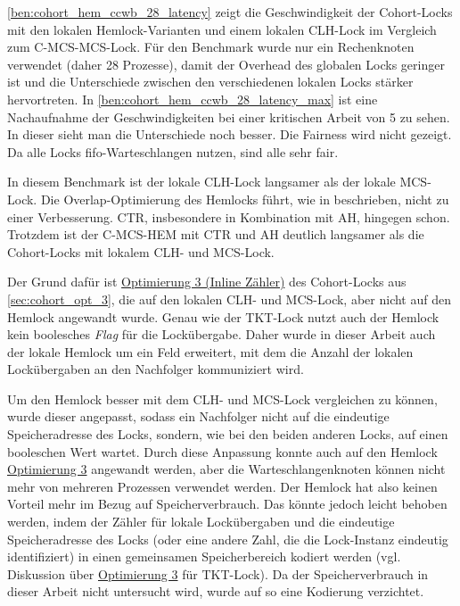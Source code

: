 \autoref{ben:cohort_hem_ccwb_28_latency} zeigt die Geschwindigkeit der Cohort-Locks mit den lokalen Hemlock-Varianten
und einem lokalen CLH-Lock
im Vergleich zum C-MCS-MCS-Lock.
Für den Benchmark wurde nur ein Rechenknoten verwendet (daher 28 Prozesse),
damit der Overhead des globalen Locks geringer ist
und die Unterschiede zwischen den verschiedenen lokalen Locks stärker hervortreten.
In \autoref{ben:cohort_hem_ccwb_28_latency_max} ist eine Nachaufnahme der Geschwindigkeiten
bei einer kritischen Arbeit von 5 zu sehen.
In dieser sieht man die Unterschiede noch besser.
Die Fairness wird nicht gezeigt.
Da alle Locks \gls{fifo}-Warteschlangen nutzen,
sind alle sehr fair.

In diesem Benchmark ist der lokale CLH-Lock langsamer
als der lokale MCS-Lock.
Die Overlap-Optimierung des Hemlocks führt,
wie in \cite{Hemlock} beschrieben,
nicht zu einer Verbesserung.
CTR,
insbesondere in Kombination mit AH,
hingegen schon.
Trotzdem ist der C-MCS-HEM mit CTR und AH deutlich langsamer
als die Cohort-Locks mit lokalem CLH- und MCS-Lock.

Der Grund dafür ist \hyperref[sec:cohort_opt_3]{Optimierung 3 (Inline Zähler)} des Cohort-Locks aus \autoref{sec:cohort_opt_3},
die auf den lokalen CLH- und MCS-Lock,
aber nicht auf den Hemlock angewandt wurde.
Genau wie der TKT-Lock nutzt auch der Hemlock kein boolesches \textit{Flag} für die Lockübergabe.
Daher wurde in dieser Arbeit auch der lokale Hemlock um ein Feld erweitert,
mit dem die Anzahl der lokalen Lockübergaben an den Nachfolger kommuniziert wird.

Um den Hemlock besser mit dem CLH- und MCS-Lock vergleichen zu können,
wurde dieser angepasst,
sodass ein Nachfolger nicht auf die eindeutige Speicheradresse des Locks,
sondern,
wie bei den beiden anderen Locks,
auf einen booleschen Wert wartet.
Durch diese Anpassung konnte auch auf den Hemlock \hyperref[sec:cohort_opt_3]{Optimierung 3} angewandt werden,
aber die Warteschlangenknoten können nicht mehr von mehreren Prozessen verwendet werden.
Der Hemlock hat also keinen Vorteil mehr im Bezug auf Speicherverbrauch.
Das könnte jedoch leicht behoben werden,
indem der Zähler für lokale Lockübergaben und die eindeutige Speicheradresse des Locks
(oder eine andere Zahl, die die Lock-Instanz eindeutig identifiziert)
in einen gemeinsamen Speicherbereich kodiert werden
(vgl. Diskussion über \hyperref[sec:cohort_opt_3]{Optimierung 3} für TKT-Lock).
Da der Speicherverbrauch in dieser Arbeit nicht untersucht wird,
wurde auf so eine Kodierung verzichtet.

